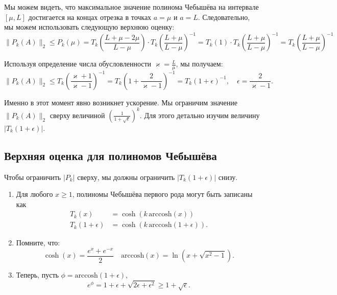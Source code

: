 \documentclass[
  russian,
  letterpaper,
  DIV=11,
  numbers=noendperiod]{scrartcl}
\begin{document}
Мы можем видеть, что максимальное значение полинома Чебышёва на
интервале \([\mu,L]\) достигается на концах отрезка в точках \(a=\mu\) и
\(a=L\). Следовательно, мы можем использовать следующую верхнюю оценку:
\[
\|P_k(A)\|_2 \le P_k(\mu) = T_k\left(\frac{L+\mu-2\mu}{L-\mu}\right) \cdot T_k\left(\frac{L+\mu}{L-\mu}\right)^{-1} = T_k\left(1\right) \cdot T_k\left(\frac{L+\mu}{L-\mu}\right)^{-1} = T_k\left(\frac{L+\mu}{L-\mu}\right)^{-1}
\]

Используя определение числа обусловленности
\(\varkappa = \frac{L}{\mu}\), мы получаем: \[
\|P_k(A)\|_2 \le T_k\left(\frac{\varkappa+1}{\varkappa-1}\right)^{-1} = T_k\left(1 + \frac{2}{\varkappa-1}\right)^{-1} = T_k\left(1 + \epsilon\right)^{-1}, \quad \epsilon = \frac{2}{\varkappa-1}.
\]

Именно в этот момент явно возникнет ускорение. Мы ограничим значение
\(\|P_k(A)\|_2\) сверху величиной
\(\left(\frac{1}{1 + \sqrt{\epsilon}}\right)^k\). Для этого детально
изучим величину \(|T_k(1 + \epsilon)|\).

\subsection{Верхняя оценка для полиномов
Чебышёва}\label{ux432ux435ux440ux445ux43dux44fux44f-ux43eux446ux435ux43dux43aux430-ux434ux43bux44f-ux43fux43eux43bux438ux43dux43eux43cux43eux432-ux447ux435ux431ux44bux448ux451ux432ux430-1}

Чтобы ограничить \(|P_k|\) сверху, мы должны ограничить
\(|T_k(1 + \epsilon)|\) снизу.

\begin{enumerate}
\def\labelenumi{\arabic{enumi}.}
\item
  Для любого \(x\ge 1\), полиномы Чебышёва первого рода могут быть
  записаны как \[
  \begin{aligned}
  T_k(x)&=\cosh\left(k\,\mathrm{arccosh}(x)\right)\\
  T_k(1+\epsilon)&=\cosh\left(k\,\mathrm{arccosh}(1+\epsilon)\right).
  \end{aligned}
  \]
\item
  Помните, что: \[
   \cosh(x)=\frac{e^x+e^{-x}}{2} \quad \mathrm{arccosh}(x) = \ln(x + \sqrt{x^2-1}).
   \]
\item
  Теперь, пусть \(\phi=\mathrm{arccosh}(1+\epsilon)\), \[
   e^{\phi}=1+\epsilon + \sqrt{2\epsilon+\epsilon^2} \geq 1+\sqrt{\epsilon}.
   \]
\end{enumerate}
\end{document}
